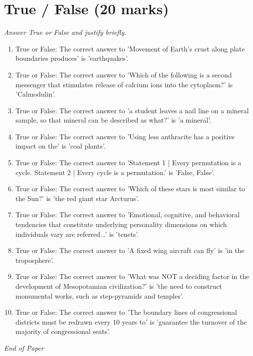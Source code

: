 \documentclass[12pt]{article}
\begin{document}
\section*{True / False (20 marks)}
\textit{Answer True or False and justify briefly.}
\begin{enumerate}[label=\arabic*.]
\item True or False: The correct answer to 'Movement of Earth's crust along plate boundaries produces' is 'earthquakes'.
\item True or False: The correct answer to 'Which of the following is a second messenger that stimulates release of calcium ions into the cytoplasm?' is 'Calmodulin'.
\item True or False: The correct answer to 'a student leaves a nail line on a mineral sample, so that mineral can be described as what?' is 'a mineral'.
\item True or False: The correct answer to 'Using less anthracite has a positive impact on the' is 'coal plants'.
\item True or False: The correct answer to 'Statement 1 | Every permutation is a cycle. Statement 2 | Every cycle is a permutation.' is 'False, False'.
\item True or False: The correct answer to 'Which of these stars is most similar to the Sun?' is 'the red giant star Arcturus'.
\item True or False: The correct answer to 'Emotional, cognitive, and behavioral tendencies that constitute underlying personality dimensions on which individuals vary are referred...' is 'tenets'.
\item True or False: The correct answer to 'A fixed wing aircraft can fly' is 'in the troposphere'.
\item True or False: The correct answer to 'What was NOT a deciding factor in the development of Mesopotamian civilization?' is 'the need to construct monumental works, such as step-pyramids and temples'.
\item True or False: The correct answer to 'The boundary lines of congressional districts must be redrawn every 10 years to' is 'guarantee the turnover of the majority of congressional seats'.
\end{enumerate}

\vfill
\noindent\textit{End of Paper}
\end{document}
